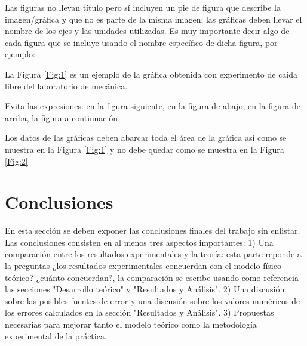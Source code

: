 \documentclass{article}
\begin{document}
\begin{multicols}{2}
Las figuras no llevan título pero sí incluyen un pie de figura que describe la imagen/gráfica y que no es parte de la misma imagen; las gr\'aficas deben llevar el nombre de los ejes y las unidades utilizadas. Es muy importante decir algo de cada figura que se incluye usando el nombre específico de dicha figura, por ejemplo: 

La Figura \ref{Fig:1} es un ejemplo de la gráfica obtenida con experimento de caída libre del laboratorio de mecánica. 

Evita las expresiones: en la figura siguiente, en la figura de abajo, en la figura de arriba, la figura a continuación. 

Los datos de las gráficas deben abarcar toda el área de la gráfica así como se muestra en la Figura \ref{Fig:1} y no debe quedar como se muestra en la Figura \ref{Fig:2}





\section*{Conclusiones}\label{Conclusiones}				%

En esta sección se deben exponer las conclusiones finales del trabajo sin enlistar. Las conclusiones consisten en al menos tres aspectos importantes: 1) Una comparación entre los resultados experimentales y la teoría: esta parte reponde a la preguntas ¿los resultados experimentales concuerdan con el modelo físico teórico? ¿cuánto concuerdan?, la comparación se escribe usando como referencia las secciones "Desarrollo teórico" y "Resultados y Análisis". 2) Una discusión sobre las posibles fuentes de error y una discusión sobre los valores numéricos de los errores calculados en la sección "Resultados y Análisis". 3) Propuestas necesarias para mejorar tanto el modelo teórico como la metodología experimental de la práctica.

\begin{thebibliography}{9}						%

%
\end{thebibliography}


\end{multicols}
\end{document}
